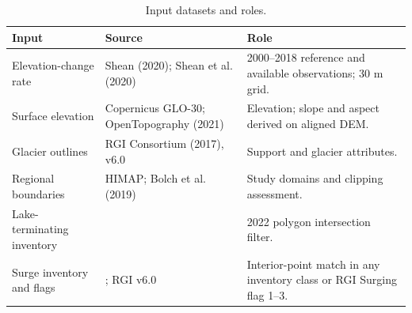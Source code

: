 \begin{table}[!htbp]\centering\small
\caption{Input datasets and roles. }\label{tab:data}
\begin{tabularx}{\textwidth}{p{}p{}X}\toprule
Input & Source & Role \\\midrule
Elevation-change rate & Shean (2020); Shean et al. (2020) & 2000--2018 reference and available observations; 30 m grid. \\
Surface elevation & Copernicus GLO-30; OpenTopography (2021) & Elevation; slope and aspect derived on aligned DEM. \\
Glacier outlines & RGI Consortium (2017), v6.0 & Support and glacier attributes. \\
Regional boundaries & HIMAP; Bolch et al. (2019) & Study domains and clipping assessment. \\
Lake-terminating inventory & \citet{luo2026} & 2022 polygon intersection filter. \\
Surge inventory and flags & \citet{guo2023}; RGI v6.0 & Interior-point match in any inventory class or RGI Surging flag 1--3. \\
\bottomrule\end{tabularx}\end{table}
